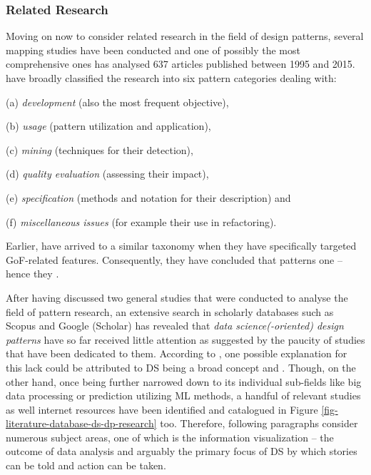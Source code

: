 \subsubsection{Related Research}
\label{ds_dp_related_research}
Moving on now to consider related research in the field of design patterns, several mapping studies have been conducted and one of possibly the most comprehensive ones has analysed 637 articles published between 1995 and 2015. 
\textcite{DPSummarySMS2016} have broadly classified the research into six pattern categories dealing with: 
%
\begin{compactitem}
    \item [(a)] \emph{development} (also the most frequent objective),
    \item [(b)] \emph{usage} (pattern utilization and application), 
    \item [(c)] \emph{mining} (techniques for their detection), 
    \item [(d)] \emph{quality evaluation} (assessing their impact), 
    \item [(e)] \emph{specification} (methods and notation for their description) and 
    \item [(f)] \emph{miscellaneous issues} (for example their use in refactoring).
\end{compactitem}

Earlier, \textcite[14]{GoFDesignPatternsAmpatzoglou2013} have arrived to a similar taxonomy when they have specifically targeted \ac{GoF}-related  features. 
Consequently, they have concluded that patterns  one -- hence they  \parencite[14]{GoFDesignPatternsAmpatzoglou2013}.

After having discussed two general studies that were conducted to analyse the field of pattern research, an extensive search in scholarly databases such as Scopus and Google (Scholar) has revealed that \emph{data science(-oriented) design patterns} have so far received little attention as suggested by the paucity of studies that have been dedicated to them.
According to \textcite[2]{CaoLong2017}, one possible explanation for this lack could be attributed to \ac{DS} being a broad concept and .
Though, on the other hand, once being further narrowed down to its individual sub-fields like big data processing or prediction utilizing \ac{ML} methods, a handful of relevant studies as well internet resources have been identified and catalogued in Figure \ref{fig-literature-database-ds-dp-research} too.
Therefore, following paragraphs consider numerous subject areas, one of which is the information visualization -- the outcome of data analysis and arguably the primary focus of \ac{DS} by which stories can be told and action can be taken.

